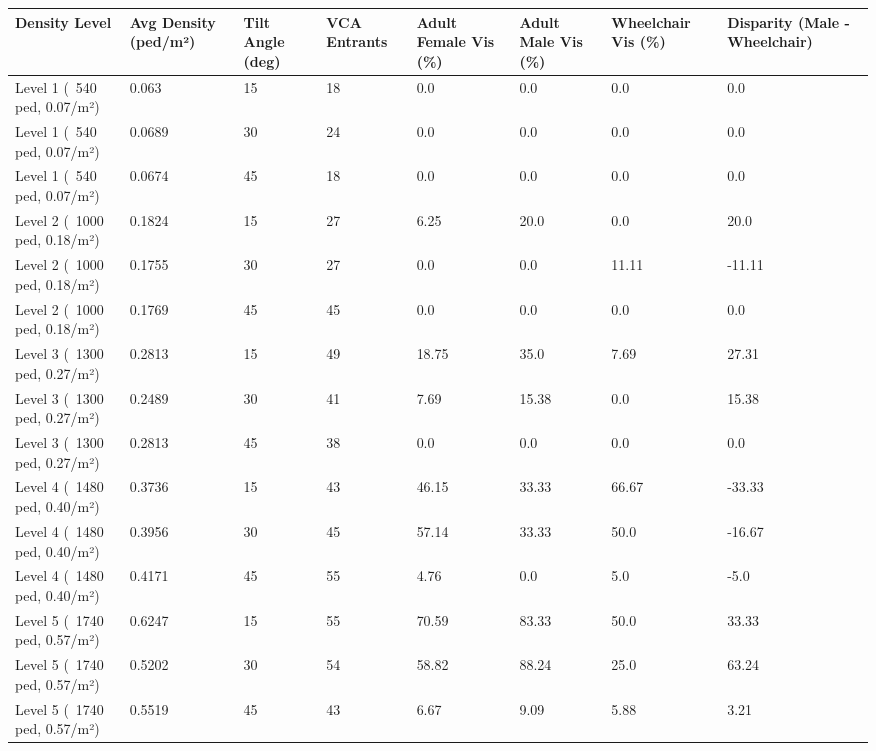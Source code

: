 \begin{tabular}{llllllll}
\hline
Density Level & Avg Density (ped/m²) & Tilt Angle (deg) & VCA Entrants & Adult Female Vis (\%) & Adult Male Vis (\%) & Wheelchair Vis (\%) & Disparity (Male - Wheelchair) \\ \hline
Level 1 (~540 ped, 0.07/m²) & 0.063 & 15 & 18 & 0.0 & 0.0 & 0.0 & 0.0 \\
Level 1 (~540 ped, 0.07/m²) & 0.0689 & 30 & 24 & 0.0 & 0.0 & 0.0 & 0.0 \\
Level 1 (~540 ped, 0.07/m²) & 0.0674 & 45 & 18 & 0.0 & 0.0 & 0.0 & 0.0 \\
Level 2 (~1000 ped, 0.18/m²) & 0.1824 & 15 & 27 & 6.25 & 20.0 & 0.0 & 20.0 \\
Level 2 (~1000 ped, 0.18/m²) & 0.1755 & 30 & 27 & 0.0 & 0.0 & 11.11 & -11.11 \\
Level 2 (~1000 ped, 0.18/m²) & 0.1769 & 45 & 45 & 0.0 & 0.0 & 0.0 & 0.0 \\
Level 3 (~1300 ped, 0.27/m²) & 0.2813 & 15 & 49 & 18.75 & 35.0 & 7.69 & 27.31 \\
Level 3 (~1300 ped, 0.27/m²) & 0.2489 & 30 & 41 & 7.69 & 15.38 & 0.0 & 15.38 \\
Level 3 (~1300 ped, 0.27/m²) & 0.2813 & 45 & 38 & 0.0 & 0.0 & 0.0 & 0.0 \\
Level 4 (~1480 ped, 0.40/m²) & 0.3736 & 15 & 43 & 46.15 & 33.33 & 66.67 & -33.33 \\
Level 4 (~1480 ped, 0.40/m²) & 0.3956 & 30 & 45 & 57.14 & 33.33 & 50.0 & -16.67 \\
Level 4 (~1480 ped, 0.40/m²) & 0.4171 & 45 & 55 & 4.76 & 0.0 & 5.0 & -5.0 \\
Level 5 (~1740 ped, 0.57/m²) & 0.6247 & 15 & 55 & 70.59 & 83.33 & 50.0 & 33.33 \\
Level 5 (~1740 ped, 0.57/m²) & 0.5202 & 30 & 54 & 58.82 & 88.24 & 25.0 & 63.24 \\
Level 5 (~1740 ped, 0.57/m²) & 0.5519 & 45 & 43 & 6.67 & 9.09 & 5.88 & 3.21 \\
\hline
\end{tabular}
